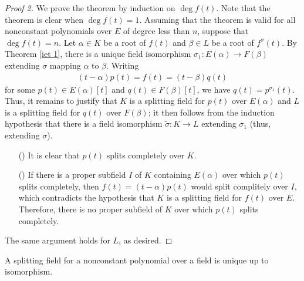 \begin{proof}[Proof 2]
    We prove the theorem by induction on $\deg f(t)$.
    Note that the theorem is clear when $\deg f(t)=1$.
    Assuming that the theorem is valid for all nonconstant polynomials over $E$ of degree less than $n$, suppose that $\deg f(t)=n$.
    Let $\alpha\in K$ be a root of $f(t)$ and $\beta\in L$ be a root of $f^\sigma(t)$.
    By Theorem \ref{iet 1}, there is a unique field isomorphism $\sigma_1: E(\alpha)\rightarrow F(\beta)$ extending $\sigma$ mapping $\alpha$ to $\beta$.
    Writing
    \begin{align*}
        (t-\alpha)p(t)=f(t)=(t-\beta)q(t)
    \end{align*}
    for some $p(t)\in E(\alpha)[t]$ and $q(t)\in F(\beta)[t]$, we have $q(t)=p^{\sigma_1}(t)$.
    Thus, it remains to justify that $K$ is a splitting field for $p(t)$ over $E(\alpha)$ and $L$ is a splitting field for $q(t)$ over $F(\beta)$; it then follows from the induction hypothesis that there is a field isomorphism $\widetilde{\sigma}: K\rightarrow L$ extending $\sigma_1$ (thus, extending $\sigma$).
    \begin{enumerate}
        \item[(\romannumeral 1)]
        {
            It is clear that $p(t)$ splits completely over $K$.
        }
        \item[(\romannumeral 2)]
        {
            If there is a proper subfield $I$ of $K$ containing $E(\alpha)$ over which $p(t)$ splits completely, then $f(t)=(t-\alpha)p(t)$ would split complitely over $I$, which contradicts the hypothesis that $K$ is a splitting field for $f(t)$ over $E$.
            Therefore, there is no proper subfield of $K$ over which $p(t)$ splits completely.
        }
    \end{enumerate}
    The same argument holds for $L$, as desired.
\end{proof}
\begin{cor}
    A splitting field for a nonconstant polynomial over a field is unique up to isomorphism.
\end{cor}


